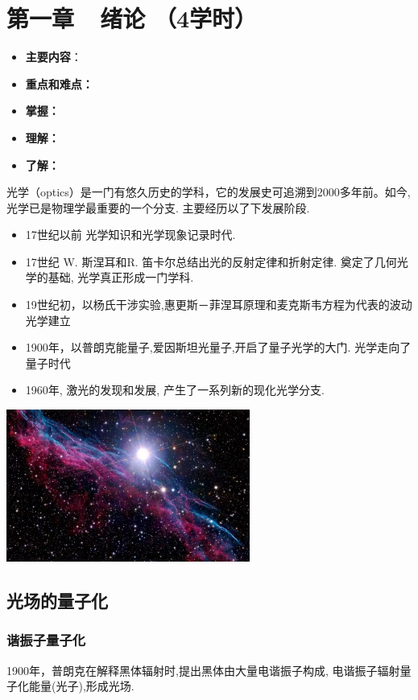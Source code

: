 \renewcommand{\thechapter}{}
\chapter{第一章~~绪论 （4学时）}
\renewcommand{\thechapter}{1}
\begin{itemize}
\item \textbf{主要内容}：
\item \textbf{重点和难点：}
\item \textbf{掌握：}
\item \textbf{理解：}
\item \textbf{了解：}
\end{itemize}

光学（optics）是一门有悠久历史的学科，它的发展史可追溯到2000多年前。如今,光学已是物理学最重要的一个分支. 主要经历以了下发展阶段.
\begin{itemize}
    \item 17世纪以前 光学知识和光学现象记录时代.
    \item 17世纪 W. 斯涅耳和R. 笛卡尔总结出光的反射定律和折射定律. 奠定了几何光学的基础, 光学真正形成一门学科. 
    \item 19世纪初，以杨氏干涉实验,惠更斯－菲涅耳原理和麦克斯韦方程为代表的波动光学建立
    \item 1900年，以普朗克能量子,爱因斯坦光量子,开启了量子光学的大门. 光学走向了量子时代 
    \item 1960年, 激光的发现和发展, 产生了一系列新的现化光学分支. 
\end{itemize}
  \begin{center}
       \includegraphics[width=0.6\textwidth]{figs/1.png}
  \end{center}

\section{光场的量子化}

\subsection{谐振子量子化}
1900年，普朗克在解释黑体辐射时,提出黑体由大量电谐振子构成, 电谐振子辐射量子化能量(光子),形成光场. \\ 
